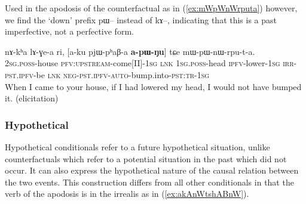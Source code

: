 \documentclass[oldfontcommands,oneside,a4paper,11pt]{article}
\newcommand{\ipa}[1]{{\phon \mbox{#1}}} %
\newcommand{\refb}[1]{(\ref{#1})}
\begin{document}
Used in the apodosis of the counterfactual as in \refb{ex:mWpWnWrputa} however, we find the `down' prefix \ipa{pɯ}-- instead of \ipa{kɤ}--, indicating that this is a past imperfective, not a perfective form.

     \begin{exe}
   \ex \label{ex:mWpWnWrputa}
   \gll
\ipa{nɤ-kʰa}   	\ipa{lɤ-ɣe-a}   	\ipa{ri,}   	[\ipa{a-ku}   	\ipa{pjɯ-pʰaβ-a}   	\textbf{\ipa{a-pɯ-ŋu}}]   	\ipa{tɕe}   	\ipa{mɯ-pɯ-nɯ-rpu-t-a.}     \\
\textsc{2sg.poss}-house \textsc{pfv:upstream}-come[II]-\textsc{1sg} \textsc{lnk} \textsc{1sg.poss}-head \textsc{ipfv}-lower-\textsc{1sg} \textsc{irr-pst.ipfv}-be \textsc{lnk}
 \textsc{neg-pst.ipfv-auto}-bump.into-\textsc{pst:tr-1sg} \\
\glt  When I came to your house, if I had lowered my head, I would not have bumped it. (elicitation)
\end{exe}



%




\subsubsection{Hypothetical}
Hypothetical conditionals refer to a future hypothetical situation,   unlike counterfactuals which refer to a potential situation in the past which did not occur. It can also express the hypothetical nature of the causal relation between the two events. This construction differs from all other conditionals in that the verb of the apodosis is in the irrealis as in \refb{ex:akAnWtshABnW}.
\end{document}
